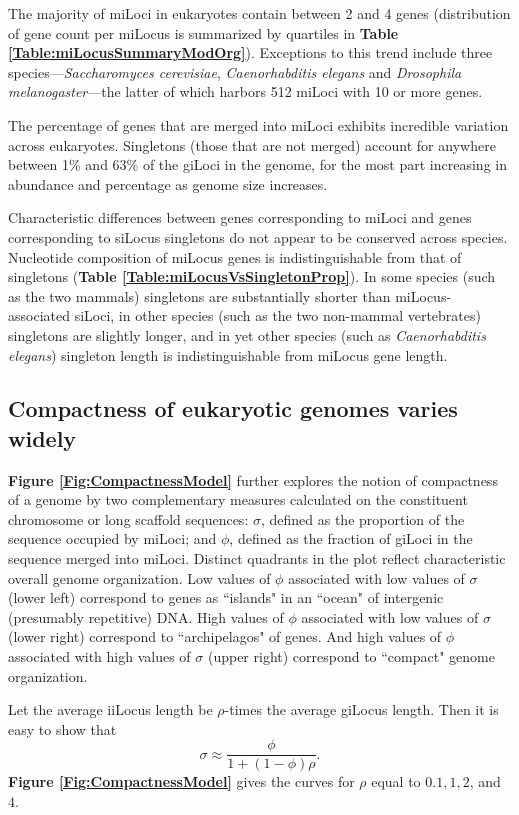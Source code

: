 The majority of miLoci in eukaryotes contain between 2 and 4 genes (distribution of gene count per miLocus is summarized by quartiles in \textbf{Table \ref{Table:miLocusSummaryModOrg}}).
Exceptions to this trend include three species---\textit{Saccharomyces cerevisiae}, \textit{Caenorhabditis elegans} and \textit{Drosophila melanogaster}---the latter of which harbors 512 miLoci with 10 or more genes.

The percentage of genes that are merged into miLoci exhibits incredible variation across eukaryotes.
Singletons (those that are not merged) account for anywhere between 1\% and 63\% of the giLoci in the genome, for the most part increasing in abundance and percentage as genome size increases.

Characteristic differences between genes corresponding to miLoci and genes corresponding to siLocus singletons do not appear to be conserved across species.
Nucleotide composition of miLocus genes is indistinguishable from that of singletons (\textbf{Table \ref{Table:miLocusVsSingletonProp}}).
In some species (such as the two mammals) singletons are substantially shorter than miLocus-associated siLoci, in other species (such as the two non-mammal vertebrates) singletons are slightly longer, and in yet other species (such as \textit{Caenorhabditis elegans}) singleton length is indistinguishable from miLocus gene length.

\subsection*{Compactness of eukaryotic genomes varies widely}

\textbf{Figure \ref{Fig:CompactnessModel}} further explores the notion of compactness of a genome by two complementary measures calculated on the constituent chromosome or long scaffold sequences:
$\sigma$, defined as the proportion of the sequence occupied by miLoci;
and $\phi$, defined as the fraction of giLoci in the sequence merged into miLoci.
Distinct quadrants in the plot reflect characteristic overall genome organization.
Low values of $\phi$ associated with low values of $\sigma$ (lower left) correspond to genes as ``islands" in an ``ocean" of intergenic (presumably repetitive) DNA.
High values of $\phi$ associated with low values of $\sigma$ (lower right) correspond to ``archipelagos" of genes.
And high values of $\phi$ associated with high values of $\sigma$ (upper right) correspond to ``compact" genome organization.

Let the average iiLocus length be $\rho$-times the average giLocus length.
Then it is easy to show that
$$\sigma \approx \frac{\phi}{1 + (1-\phi)\rho}.$$
\textbf{Figure \ref{Fig:CompactnessModel}} gives the curves for $\rho$ equal to $0.1, 1, 2$, and $4$.

